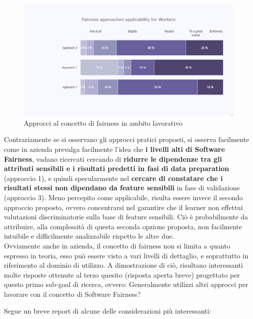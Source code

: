       \begin{figure}[h!]
        \centering
        \includegraphics[width=1\textwidth]{figure/Analisi/RQ1/Hist_Fairness_Approaches_Applicability.png}
        \caption{Approcci al concetto di fairness in ambito lavorativo}
    \end{figure}
    
    Contrariamente se si osservano gli approcci pratici proposti, si osserva facilmente come in azienda prevalga facilmente l'idea che \textbf{i livelli alti di Software Fairness}, vadano ricercati cercando di \textbf{ridurre le dipendenze tra gli attributi sensibili e i risultati predetti in fasi di data preparation} (approccio 1), e quindi specularmente nel \textbf{cercare di constatare che i risultati stessi non dipendano da feature sensibili} in fase di validazione (approccio 3). Meno percepito come applicabile, risulta essere invece il secondo approccio proposto, ovvero concentrarsi nel garantire che il learner non effettui valutazioni discriminatorie sulla base di feature sensibili. Ciò è probabilmente da attribuire, alla complessità di questa seconda opzione proposta, non facilmente intuibile e difficilmente analizzabile rispetto le altre due.\\
    
    Ovviamente anche in azienda, il concetto di fairness non si limita a quanto espresso in teoria, esso può essere visto a vari livelli di dettaglio, e soprattutto in riferimento al dominio di utilizzo. A dimostrazione di ciò, risultano interessanti molte risposte ottenute al terzo quesito (risposta aperta breve) progettato per questo primo sub-goal di ricerca, ovvero: Generalmente utilizzi altri approcci per lavorare con il concetto di Software Fairness?
	
	Segue un breve report di alcune delle considerazioni più interessanti:
	
